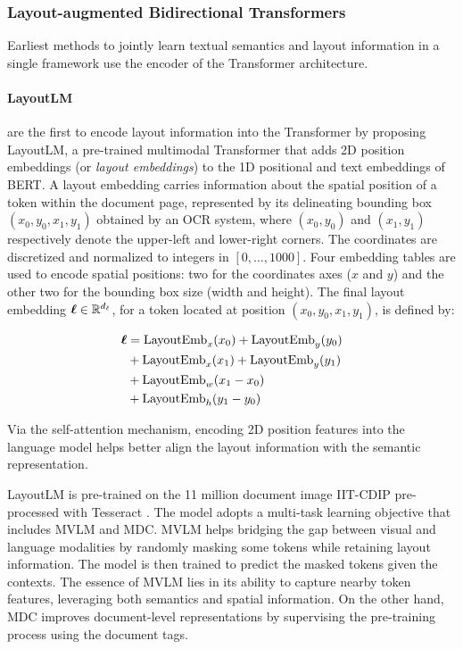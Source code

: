 
\subsubsection{Layout-augmented Bidirectional Transformers}

Earliest methods to jointly learn textual semantics and layout information in a single framework use the encoder of the Transformer architecture.

\paragraph{LayoutLM}

\citet{xu2020layoutlm} are the first to encode layout information into the Transformer by proposing LayoutLM, a pre-trained multimodal Transformer that adds 2D position embeddings (or \textit{layout embeddings}) to the 1D positional and text embeddings of BERT. A layout embedding carries information about the spatial position of a token within the document page, represented by its delineating bounding box $(x_0, y_0, x_1, y_1)$ obtained by an OCR system, where $(x_0, y_0)$ and $(x_1, y_1)$ respectively denote the upper-left and lower-right corners. The coordinates are discretized and normalized to integers in $[0, \ldots, 1000]$. Four embedding tables are used to encode spatial positions: two for the coordinates axes ($x$ and $y$) and the other two for the bounding box size (width and height). The final layout embedding $\boldsymbol{\ell} \in \mathbb{R}^{d_{\ell}}$, for a token located at position $(x_0, y_0, x_1, y_1)$, is defined by:

\begin{equation}
\begin{split}
    \boldsymbol{\ell} & = \text{LayoutEmb}_x(x_0) + \text{LayoutEmb}_y(y_0) \\
    & + \text{LayoutEmb}_x(x_1) + \text{LayoutEmb}_y(y_1) \\
    & + \text{LayoutEmb}_w(x_1 - x_0) \\
    & + \text{LayoutEmb}_h(y_1 - y_0) \\
\end{split}
\end{equation}

Via the self-attention mechanism, encoding 2D position features into the language model helps better align the layout information with the semantic representation. 

LayoutLM is pre-trained on the 11 million document image IIT-CDIP \citep{lewis2006building} pre-processed with Tesseract \citep{kay2007tesseract}. The model adopts a multi-task learning objective that includes \ac{MVLM} and \ac{MDC}. \ac{MVLM} helps bridging the gap between visual and language modalities by randomly masking some tokens while retaining layout information. The model is then trained to predict the masked tokens given the contexts. The essence of \ac{MVLM} lies in its ability to capture nearby token features, leveraging both semantics and spatial information. On the other hand, \ac{MDC} improves document-level representations by supervising the pre-training process using the document tags. 

